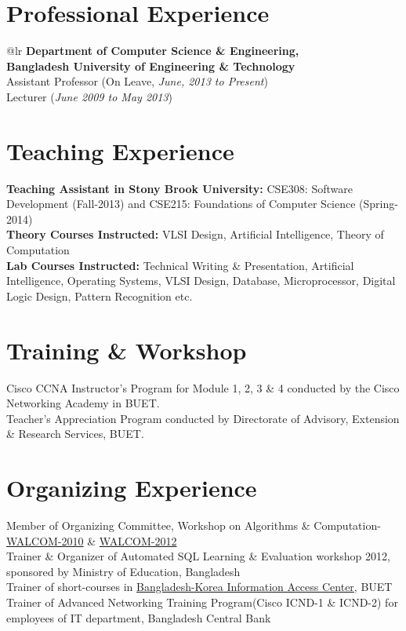 \documentclass[margin,line,pifont,palatino,courier]{res}
\begin{document}
\begin{resume}
\section{\sc Professional Experience}
\begin{tabular}{@{}{l}{r}}
\textbf{Department of Computer Science \& Engineering, }\\
\textbf{Bangladesh University of Engineering \& Technology} \\
Assistant Professor (On Leave, \textit{June, 2013
to Present})\\
Lecturer (\textit{June 2009 to May 2013})
\end{tabular}
\section{\sc Teaching Experience}
\textbf{ Teaching Assistant in Stony Brook University: } CSE308: Software
Development (Fall-2013) and CSE215: Foundations of Computer Science
(Spring-2014)\\
 \textbf{Theory Courses Instructed:
}VLSI Design, Artificial Intelligence, Theory of Computation\\
\textbf{Lab Courses Instructed: }Technical Writing \& Presentation, Artificial Intelligence,
Operating Systems, VLSI Design, Database, Microprocessor, Digital Logic Design, Pattern Recognition etc.\\
\section{\sc Training \& Workshop}
\textbullet{ }Cisco CCNA Instructor's Program for Module 1, 2, 3 \& 4 conducted by the Cisco
Networking Academy in BUET.\\
\textbullet{ }Teacher's Appreciation Program conducted by Directorate of Advisory, Extension \&
Research Services, BUET.

\section{\sc Organizing Experience}
\textbullet{ }Member of Organizing Committee, Workshop on Algorithms \& Computation-
\href{http://www.buet.ac.bd/cse/walcom2010/}{WALCOM-2010}
\&
\href{http://www.buet.ac.bd/cse/walcom2012}{WALCOM-2012}\\
\textbullet{ }Trainer \& Organizer of Automated SQL Learning \& Evaluation workshop 2012, sponsored
by Ministry of Education, Bangladesh\\
\textbullet{ }Trainer of short-courses in \href{http://www.buet.ac.bd/cse/iac}{Bangladesh-Korea
Information Access Center}, BUET\\
\textbullet{ }Trainer of Advanced Networking Training Program(Cisco ICND-1 \& ICND-2) for employees
of IT department, Bangladesh Central Bank


\end{resume}
\end{document}
